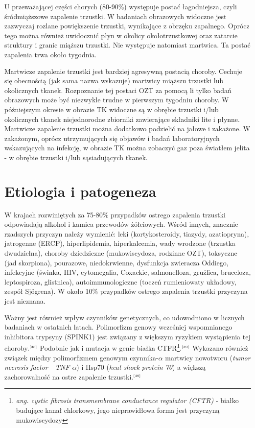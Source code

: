 \documentclass[a4paper, 12pt]{report}
\newcommand\cyt[1]{$^{\tiny{\cite{#1}}}$}
\begin{document}
U przeważającej części chorych (80-90\%) występuje postać łagodniejsza,
czyli śródmiąższowe zapalenie trzustki. W badaniach obrazowych
widoczne jest zazwyczaj rozlane powiększenie trzustki, wynikające z
obrzęku zapalnego. Oprócz tego można również uwidocznić płyn w okolicy
okołotrzustkowej oraz zatarcie struktury i granic miąższu
trzustki. Nie występuje natomiast martwica. Ta postać zapalenia trwa
około tygodnia.

Martwicze zapalenie trzustki jest bardziej agresywną postacią
choroby. Cechuje się obecnością (jak sama nazwa wskazuje) martwicy
miąższu trzustki lub okolicznych tkanek. Rozpoznanie tej postaci OZT
za pomocą li tylko badań obrazowych może być niezwykle trudne w
pierwszym tygodniu choroby. W późniejszym okresie w obrazie TK
widoczne są w obrębie trzustki i/lub okolicznych tkanek niejednorodne
zbiorniki zawierające składniki lite i płynne. Martwicze zapalenie
trzustki można dodatkowo podzielić na jałowe i zakażone. W zakażonym,
oprócz utrzymujących się objawów i badań laboratoryjnych wskazujących
na infekcję, w obrazie TK można zobaczyć gaz poza światłem jelita - w
obrębie trzustki i/lub sąsiadujących tkanek.

\chapter{Etiologia i patogeneza}

W krajach rozwiniętych za 75-80\% przypadków ostrego zapalenia
trzustki odpowiadają alkohol i kamica przewodów żółciowych. Wśród
innych, znacznie rzadszych przyczyn należy wymienić: leki
(kortykosteroidy, tiazydy, azatiopryna), jatrogenne (ERCP),
hiperlipidemia, hiperkalcemia, wady wrodzone (trzustka dwudzielna),
choroby dziedziczne (mukowiscydoza, rodzinne OZT), toksyczne (jad
skorpiona), pourazowe, niedokrwienne, dysfunkcja zwieracza Oddiego,
infekcyjne (świnka, HIV, cytomegalia, Coxackie, salmonelloza,
gruźlica, bruceloza, leptospiroza, glistnica), autoimmunologiczne
(toczeń rumieniowaty układowy, zespół Sjögrena). W około 10\% przypadków
ostrego zapalenia trzustki przyczyna jest nieznana. 

Ważny jest również wpływ czynników genetycznych, co udowodniono w
licznych badaniach w ostatnich latach.  Polimorfizm genowy wcześniej
wspomnianego inhibitora trypsyny (SPINK1) jest związany z większym
ryzykiem wystąpienia tej choroby.\cyt{38} Podobnie jak i mutacja w
genie białka CTFR\footnote{\textsl{ang. cystic fibrosis transmembrane
    conductance regulator (CFTR)} - białko budujące kanał chlorkowy,
  jego nieprawidłowa forma jest przyczyną mukowiscydozy}.\cyt{39}
Wykazano również związek między polimorfizmem genowym
czynnika-$\alpha$ martwicy nowotworu (\textsl{tumor necrosis factor -
  TNF-$\alpha$}) i Hsp70 (\textsl{heat shock protein 70}) a większą
zachorowalność na ostre zapalenie trzustki.\cyt{40}
\end{document}
